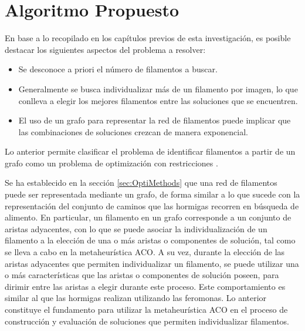 \chapter{Algoritmo Propuesto}
\label{sec:modeloOpti}

En base a lo recopilado en los cap\'itulos previos de esta investigaci\'on, es posible destacar los siguientes aspectos del problema a resolver:

\begin{itemize}
    \item Se desconoce a priori el n\'umero de filamentos a buscar.%
    \item Generalmente se busca individualizar m\'as de un filamento por imagen, lo que conlleva a elegir los mejores filamentos entre las soluciones que se encuentren.
    \item El uso de un grafo para representar la red de filamentos puede implicar que las combinaciones de soluciones crezcan de manera exponencial.
\end{itemize}

Lo anterior permite clasificar el problema de identificar filamentos a partir de un grafo como un problema de optimizaci\'on con restricciones .


Se ha establecido en la secci\'on \ref{sec:OptiMethods} que una red de filamentos puede ser representada mediante un grafo, de forma similar a lo que sucede con la representaci\'on del conjunto de caminos que las hormigas recorren en b\'usqueda de alimento. En particular, un filamento en un grafo corresponde a un conjunto de aristas adyacentes, con lo que se puede asociar la individualizaci\'on de un filamento a la elecci\'on de una o m\'as aristas o componentes de soluci\'on, tal como se lleva a cabo en la metaheur\'istica ACO. A su vez, durante la elecci\'on de las aristas adyacentes que permiten individualizar un filamento, se puede utilizar una o m\'as caracter\'isticas que las aristas o componentes de soluci\'on poseen, para dirimir entre las aristas a elegir durante este proceso. Este comportamiento es similar al que las hormigas realizan utilizando las feromonas. Lo anterior constituye el fundamento para utilizar la metaheur\'istica ACO en el proceso de construcci\'on y evaluaci\'on de soluciones que permiten individualizar filamentos.

